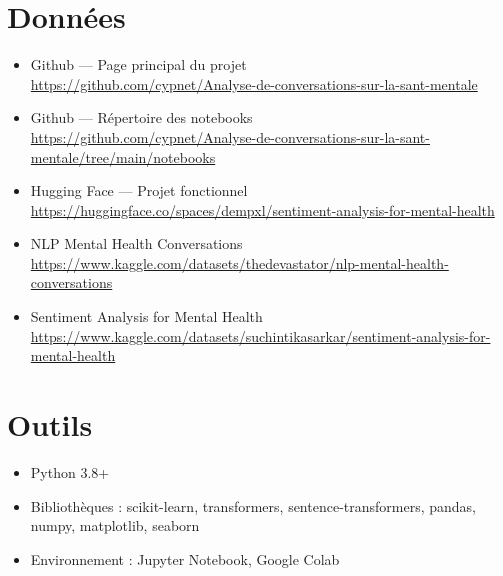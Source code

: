 \documentclass[12pt,a4paper]{report}
\begin{document}
\section*{Données}

\begin{itemize}
  \item Github — Page principal du projet\\
    \url{https://github.com/cypnet/Analyse-de-conversations-sur-la-sant-mentale}
  \item Github — Répertoire des notebooks\\
    \url{https://github.com/cypnet/Analyse-de-conversations-sur-la-sant-mentale/tree/main/notebooks}
  \item Hugging Face — Projet fonctionnel\\
    \url{https://huggingface.co/spaces/dempxl/sentiment-analysis-for-mental-health}
  \item NLP Mental Health Conversations\\
    \url{https://www.kaggle.com/datasets/thedevastator/nlp-mental-health-conversations}
  \item Sentiment Analysis for Mental Health\\
    \url{https://www.kaggle.com/datasets/suchintikasarkar/sentiment-analysis-for-mental-health}
\end{itemize}

\section*{Outils}
\begin{itemize}
  \item Python 3.8+
  \item Bibliothèques : scikit-learn, transformers, sentence-transformers, pandas, numpy, matplotlib, seaborn
  \item Environnement : Jupyter Notebook, Google Colab
\end{itemize}
\end{document}
